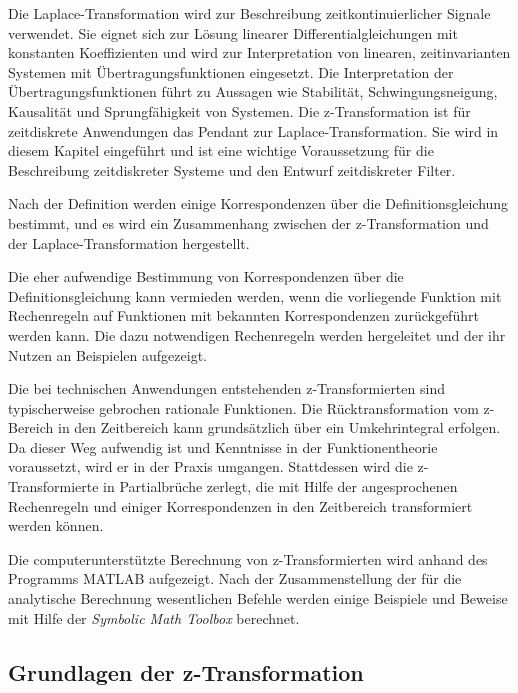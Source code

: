 \noindent Die Laplace-Transformation wird zur Beschreibung zeitkontinuierlicher Signale verwendet. Sie eignet sich zur L\"{o}sung linearer Differentialgleichungen mit konstanten Koeffizienten und wird zur Interpretation von linearen, zeitinvarianten Systemen mit \"{U}bertragungsfunktionen eingesetzt. Die Interpretation der \"{U}bertragungsfunktionen f\"{u}hrt zu Aussagen wie Stabilit\"{a}t, Schwingungsneigung, Kausalit\"{a}t und Sprungf\"{a}higkeit von Systemen. Die z-Transformation ist f\"{u}r zeitdiskrete Anwendungen das Pendant zur Laplace-Transformation. Sie wird in diesem Kapitel eingef\"{u}hrt und ist eine wichtige Voraussetzung f\"{u}r die Beschreibung zeitdiskreter Systeme und den Entwurf zeitdiskreter Filter. \medskip

\noindent Nach der Definition werden einige Korrespondenzen \"{u}ber die Definitionsgleichung bestimmt, und es wird ein Zusammenhang zwischen der z-Transformation und der Laplace-Transformation hergestellt.\medskip

\noindent Die eher aufwendige Bestimmung von Korrespondenzen \"{u}ber die Definitionsgleichung kann vermieden werden, wenn die vorliegende Funktion mit Rechenregeln auf Funktionen mit bekannten Korrespondenzen zur\"{u}ckgef\"{u}hrt werden kann. Die dazu notwendigen Rechenregeln werden hergeleitet und der ihr Nutzen an Beispielen aufgezeigt. \medskip

\noindent Die bei technischen Anwendungen entstehenden z-Transformierten sind typischerweise gebrochen rationale Funktionen. Die R\"{u}cktransformation vom z-Bereich in den Zeitbereich kann grunds\"{a}tzlich \"{u}ber ein Umkehrintegral erfolgen. Da dieser Weg aufwendig ist und Kenntnisse in der Funktionentheorie voraussetzt, wird er in der Praxis umgangen. Stattdessen wird die z-Transformierte in Partialbr\"{u}che zerlegt, die mit Hilfe der angesprochenen Rechenregeln und einiger Korrespondenzen in den Zeitbereich transformiert werden k\"{o}nnen.\medskip

\noindent Die computerunterst\"{u}tzte Berechnung von z-Transformierten wird anhand des Programms MATLAB aufgezeigt. Nach der Zusammenstellung der f\"{u}r die analytische Berechnung wesentlichen Befehle werden einige Beispiele und Beweise mit Hilfe der \textit{Symbolic Math Toolbox} berechnet.

\subsection{Grundlagen der z-Transformation}

